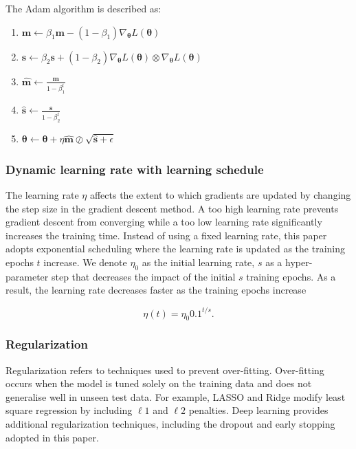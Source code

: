 \documentclass[12pt]{article}
\providecommand{\tightlist}{%
  \setlength{\itemsep}{0pt}\setlength{\parskip}{0pt}}
\begin{document}
The Adam algorithm is described as:

\begin{enumerate}
\def\labelenumi{\arabic{enumi}.}
\tightlist
\item
  \(\mathbf{m} \leftarrow \beta_1 \mathbf{m} - (1-\beta_1) \nabla_{\mathbf{\theta}} L(\mathbf{\theta})\)
\item
  \(\mathbf{s} \leftarrow \beta_2 \mathbf{s} + (1-\beta_2) \nabla_{\mathbf{\theta}} L(\mathbf{\theta}) \otimes \nabla_{\mathbf{\theta}} L(\mathbf{\theta})\)
\item
  \(\hat{ \mathbf{m} } \leftarrow \frac{\mathbf{m}}{1-\beta_1^t}\)
\item
  \(\hat{ \mathbf{s} } \leftarrow \frac{\mathbf{s}}{1-\beta_2^t}\)
\item
  \(\mathbf{\theta} \leftarrow \mathbf{\theta} + \eta \hat{ \mathbf{m} } \oslash \sqrt{\hat{ \mathbf{s} } + \epsilon}\)
\end{enumerate}

\hypertarget{dynamic-learning-rate-with-learning-schedule}{%
\subsubsection{Dynamic learning rate with learning schedule}\label{dynamic-learning-rate-with-learning-schedule}}

The learning rate \(\eta\) affects the extent to which gradients are
updated by changing the step size in the gradient
descent method. A too high learning rate prevents gradient descent
from converging while a too low learning rate significantly
increases the training time. Instead of using a fixed
learning rate, this paper adopts exponential scheduling
where the learning rate is updated as the training epochs
\(t\) increase. We denote \(\eta_0\) as the initial learning
rate, \(s\) as a hyper-parameter step that decreases the
impact of the initial \(s\) training epochs. As a result, the
learning rate decreases faster as the training epochs
increase

\[
\eta(t) = \eta_0 0.1 ^{t/s}.
\]

\hypertarget{regularization}{%
\subsubsection{Regularization}\label{regularization}}

Regularization refers to techniques used to prevent
over-fitting. Over-fitting occurs when the model is tuned
solely on the training data and does not generalise well in
unseen test data. For example, LASSO and Ridge modify
least square regression by including \(\ell 1\) and \(\ell 2\)
penalties. Deep learning provides additional regularization
techniques, including the dropout and early stopping
adopted in this paper.
\end{document}

